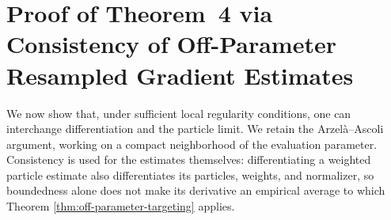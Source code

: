 \documentclass[11pt]{article}
\newcommand\thmMopGradConsistency{4}
\theoremstyle{thmstylethree}%
\begin{document}
\section{Proof of Theorem~{\thmMopGradConsistency} via Consistency of Off-Parameter Resampled Gradient Estimates}
\label{appendix:consistency}



We now show that, under sufficient local regularity conditions, one can interchange differentiation and the particle limit. We retain the Arzel\`a--Ascoli argument, working on a compact neighborhood of the evaluation parameter. Consistency is used for the estimates themselves: differentiating a weighted particle estimate also differentiates its particles, weights, and normalizer, so boundedness alone does not make its derivative an empirical average to which Theorem \ref{thm:off-parameter-targeting} applies.
\end{document}
